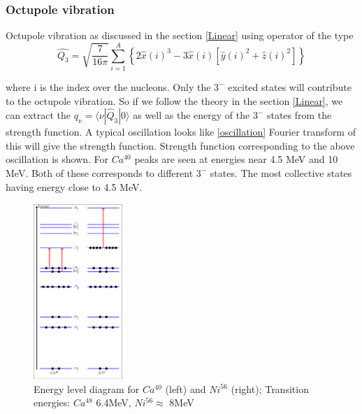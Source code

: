 \documentclass[a4paper]{paper}
\begin{document}
                \subsubsection{Octupole vibration}
                    Octupole vibration as discussed in the section  \ref{Linear} using operator of the type 
                    \begin{equation}
                        \hat{Q_3} = \sqrt{\frac{7}{16\pi}}\sum_{i=1}^{A}\left\{2\hat{x}(i)^3 - 3\hat{x}(i)\left[\hat{y}(i)^2 + \hat{z}(i)^2\right]\right\}
                    \end{equation}
                    
                    
                    where i is the index over the nucleons. Only the $3^{-}$ excited states will contribute to the octupole vibration. So if we follow the theory in the section \ref{Linear}, we can extract the $q_{\nu} = \langle\nu|\hat{Q}_3|0\rangle$ as well as the energy of the $3^{-}$ states from the strength function.
                    A typical oscillation looks like \ref{oscillation}
                    Fourier transform of this will give the strength function. Strength function corresponding to the above oscillation is shown. For $Ca^{40}$ peaks are seen at energies near 4.5 MeV and 10 MeV. Both of these corresponds to different $3^{-}$ states. The most collective states having energy close to 4.5 MeV.
                    \begin{figure}
                        \centering
                        \includegraphics[width=0.30\textwidth]{image/levelCaNi}
                        \caption{Energy level diagram for $Ca^{40}$ (left) and $Ni^{56}$ (right); Transition energies: $Ca^{48}$ 6.4MeV, $Ni^{56}\approx$ 8MeV}
                        \label{fig:levelCaNi}
                    \end{figure} 
\end{document}
